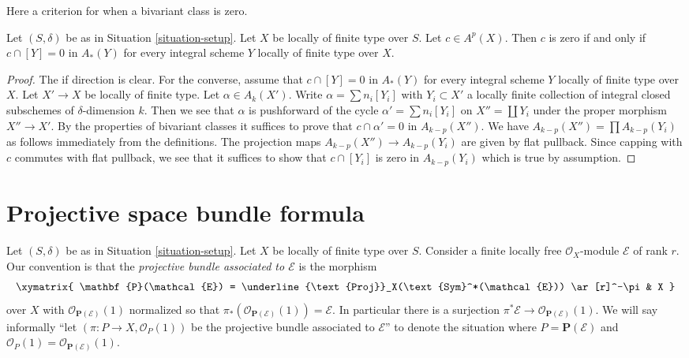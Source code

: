 \noindent
Here a criterion for when a bivariant class is zero.

\begin{lemma}
\label{lemma-bivariant-zero}
Let $(S, \delta)$ be as in Situation \ref{situation-setup}.
Let $X$ be locally of finite type over $S$. Let $c \in A^p(X)$.
Then $c$ is zero if and only if $c \cap [Y] = 0$ in $A_*(Y)$
for every integral scheme $Y$ locally of finite type over $X$.
\end{lemma}

\begin{proof}
The if direction is clear. For the converse, assume that $c \cap [Y] = 0$ in
$A_*(Y)$ for every integral scheme $Y$ locally of finite type over $X$.
Let $X' \to X$ be locally of finite type. Let $\alpha \in A_k(X')$.
Write $\alpha = \sum n_i [Y_i]$ with $Y_i \subset X'$ a locally finite
collection of integral closed subschemes of $\delta$-dimension $k$.
Then we see that $\alpha$ is pushforward of the cycle
$\alpha' = \sum n_i[Y_i]$ on $X'' = \coprod Y_i$ under the
proper morphism $X'' \to X'$. By the properties of bivariant
classes it suffices to prove that $c \cap \alpha' = 0$ in $A_{k - p}(X'')$.
We have $A_{k - p}(X'') = \prod A_{k - p}(Y_i)$ as follows immediately
from the definitions. The projection maps $A_{k - p}(X'') \to A_{k - p}(Y_i)$
are given by flat pullback. Since capping with $c$ commutes with
flat pullback, we see that it suffices to show that $c \cap [Y_i]$
is zero in $A_{k - p}(Y_i)$ which is true by assumption.
\end{proof}





\section{Projective space bundle formula}
\label{section-projective-space-bundle-formula}

\noindent
Let $(S, \delta)$ be as in Situation \ref{situation-setup}.
Let $X$ be locally of finite type over $S$.
Consider a finite locally free $\mathcal{O}_X$-module
$\mathcal{E}$ of rank $r$.
Our convention is that the {\it projective bundle associated to
$\mathcal{E}$} is the morphism
$$
\xymatrix{
\mathbf{P}(\mathcal{E}) =
\underline{\text{Proj}}_X(\text{Sym}^*(\mathcal{E}))
\ar[r]^-\pi
& X
}
$$
over $X$ with
$\mathcal{O}_{\mathbf{P}(\mathcal{E})}(1)$ normalized so that
$\pi_*(\mathcal{O}_{\mathbf{P}(\mathcal{E})}(1)) = \mathcal{E}$.
In particular there is a surjection
$\pi^*\mathcal{E} \to \mathcal{O}_{\mathbf{P}(\mathcal{E})}(1)$.
We will say informally ``let $(\pi : P \to X, \mathcal{O}_P(1))$
be the projective bundle associated to $\mathcal{E}$'' to denote
the situation where $P = \mathbf{P}(\mathcal{E})$ and
$\mathcal{O}_P(1) = \mathcal{O}_{\mathbf{P}(\mathcal{E})}(1)$.


